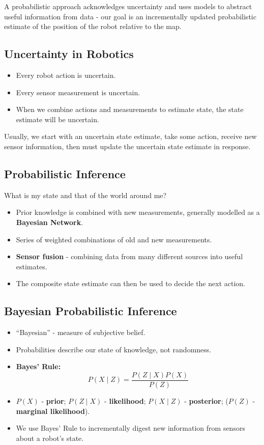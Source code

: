 \documentclass[11pt]{article}
\begin{document}
A probabilistic approach acknowledges uncertainty and uses models to abstract useful information from data - our goal is an incrementally updated probabilistic estimate of the position of the robot relative to the map.

\subsection{Uncertainty in Robotics}
\begin{itemize}
  \item Every robot action is uncertain.
  \item Every sensor measurement is uncertain.
  \item When we combine actions and measurements to estimate state, the state estimate will be uncertain.
\end{itemize}

Usually, we start with an uncertain state estimate, take some action, receive new sensor information, then must update the uncertain state estimate in response.

\subsection{Probabilistic Inference}
What is my state and that of the world around me?
\begin{itemize}
  \item Prior knowledge is combined with new measurements, generally modelled as a \textbf{Bayesian Network}.
  \item Series of weighted combinations of old and new measurements.
  \item \textbf{Sensor fusion} - combining data from many different sources into useful estimates.
  \item The composite state estimate can then be used to decide the next action.
\end{itemize}

\subsection{Bayesian Probabilistic Inference}
\begin{itemize}
  \item ``Bayesian'' - measure of subjective belief.
  \item Probabilities describe our state of knowledge, not randomness.
  \item \textbf{Bayes' Rule:}
    \[
      P(X \mid Z) = \frac{P(Z \mid X)P(X)}{P(Z)}
    \]
  \item $P(X)$ - \textbf{prior}; $P(Z \mid X)$ - \textbf{likelihood}; $P(X \mid Z)$ - \textbf{posterior}; ($P(Z)$ - \textbf{marginal likelihood}).
  \item We use Bayes' Rule to incrementally digest new information from sensors about a robot's state.
\end{itemize}
\end{document}
